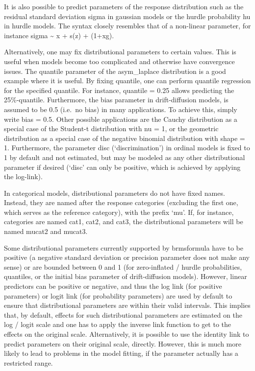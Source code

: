 \documentclass[]{book}
\begin{document}
It is also possible to predict parameters of the response distribution
such as the residual standard deviation sigma in gaussian models or the
hurdle probability hu in hurdle models. The syntax closely resembles
that of a non-linear parameter, for instance sigma \textasciitilde{} x +
s(z) + (1+x\textbar{}g).

Alternatively, one may fix distributional parameters to certain values.
This is useful when models become too complicated and otherwise have
convergence issues. The quantile parameter of the asym\_laplace
distribution is a good example where it is useful. By fixing quantile,
one can perform quantile regression for the specified quantile. For
instance, quantile = 0.25 allows predicting the 25\%-quantile.
Furthermore, the bias parameter in drift-diffusion models, is assumed to
be 0.5 (i.e.~no bias) in many applications. To achieve this, simply
write bias = 0.5. Other possible applications are the Cauchy
distribution as a special case of the Student-t distribution with nu =
1, or the geometric distribution as a special case of the negative
binomial distribution with shape = 1. Furthermore, the parameter disc
(`discrimination') in ordinal models is fixed to 1 by default and not
estimated, but may be modeled as any other distributional parameter if
desired (`disc' can only be positive, which is achieved by applying the
log-link).

In categorical models, distributional parameters do not have fixed
names. Instead, they are named after the response categories (excluding
the first one, which serves as the reference category), with the prefix
`mu'. If, for instance, categories are named cat1, cat2, and cat3, the
distributional parameters will be named mucat2 and mucat3.

Some distributional parameters currently supported by brmsformula have
to be positive (a negative standard deviation or precision parameter
does not make any sense) or are bounded between 0 and 1 (for
zero-inflated / hurdle probabilities, quantiles, or the initial bias
parameter of drift-diffusion models). However, linear predictors can be
positive or negative, and thus the log link (for positive parameters) or
logit link (for probability parameters) are used by default to ensure
that distributional parameters are within their valid intervals. This
implies that, by default, effects for such distributional parameters are
estimated on the log / logit scale and one has to apply the inverse link
function to get to the effects on the original scale. Alternatively, it
is possible to use the identity link to predict parameters on their
original scale, directly. However, this is much more likely to lead to
problems in the model fitting, if the parameter actually has a
restricted range.
\end{document}
